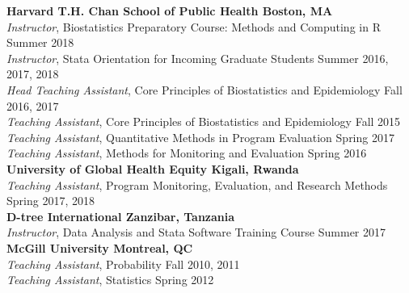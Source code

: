 \documentclass[12pt]{article}
\begin{document}
\textbf{Harvard T.H. Chan School of Public Health \hfill \hfill Boston, MA} \\
\textit{Instructor}, Biostatistics Preparatory Course: Methods and Computing in R \hfill \hfill Summer 2018 \\
\textit{Instructor}, Stata Orientation for Incoming Graduate Students \hfill \hfill	Summer 2016, 2017, 2018\\
\textit{Head Teaching Assistant}, Core Principles of Biostatistics and Epidemiology \hfill \hfill Fall 2016, 2017 \\
\textit{Teaching Assistant}, Core Principles of Biostatistics and Epidemiology \hfill \hfill Fall 2015 \\
\textit{Teaching Assistant}, Quantitative Methods in Program Evaluation \hfill \hfill Spring 2017 \\
\textit{Teaching Assistant}, Methods for Monitoring and Evaluation \hfill \hfill Spring 2016 \\

\textbf{University of Global Health Equity \hfill \hfill Kigali, Rwanda} \\
\textit{Teaching Assistant}, Program Monitoring, Evaluation, and Research Methods  \hfill \hfill Spring 2017, 2018 \\

\textbf{D-tree International \hfill \hfill Zanzibar, Tanzania}\\
\textit{Instructor}, Data Analysis and Stata Software Training Course \hfill \hfill Summer 2017  \\

\textbf{McGill University \hfill \hfill Montreal, QC}\\
\textit{Teaching Assistant}, Probability \hfill \hfill Fall 2010, 2011 \\
\textit{Teaching Assistant}, Statistics \hfill \hfill Spring 2012 

%
\end{document}
